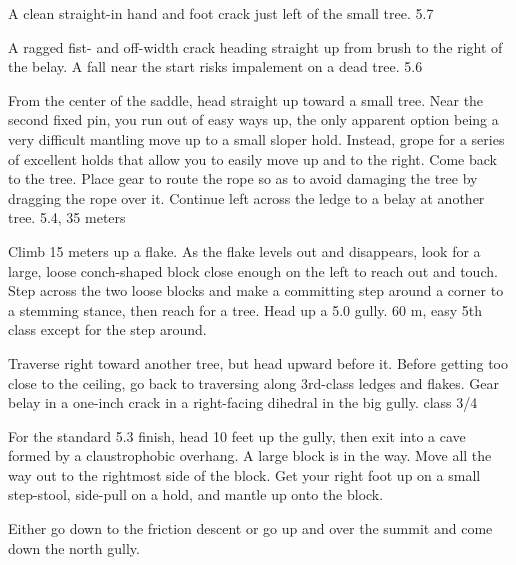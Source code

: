 \documentclass{tahquitz}
\begin{document}
 A clean straight-in hand and foot crack just left of the small
tree. 5.7

 A ragged fist- and off-width crack heading straight up from brush
to the right of the belay. A fall near the start risks impalement on a dead tree. 5.6

 From the center of the saddle, head straight up toward a small
tree. Near the second fixed pin, you run out of easy ways up, the
only apparent option being a very difficult mantling move up to a
small sloper hold. Instead, grope for a series of excellent holds that allow
you to easily move up and to the right. Come back to the tree. Place
gear to route the rope so as to avoid damaging the tree by dragging
the rope over it. Continue left across the ledge to a belay at
another tree. 5.4, 35 meters

 Climb 15 meters up a flake. As the flake levels out and
disappears, look for a large, loose conch-shaped block close enough
on the left to reach out and touch. Step across the two loose blocks and
make a committing step around a corner to a stemming stance, then
reach for a tree. Head up a 5.0 gully. 60 m, easy 5th class except for
the step around.

 Traverse right toward another tree, but head upward before
it.  Before getting too close to the ceiling, go back to traversing
along 3rd-class ledges and flakes.  Gear belay in a one-inch
crack in a right-facing dihedral in the big gully. class 3/4

 For the standard 5.3 finish, head 10 feet up the gully,
then exit into a cave formed by a claustrophobic overhang. 
A large block is in the way.
Move all the way out to the rightmost side of
the block. Get your right foot up on a small step-stool,
side-pull on a hold, and mantle up onto the block.

Either go down to the friction descent or go up and over the summit
and come down the north gully.

\myfooter\vfill %
\end{document}
